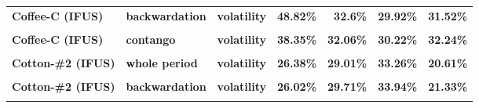 \documentclass[
  authoryear,
  preprint,
  3p]{elsarticle}
\begin{document}
\begin{longtable}[t]{>{}l>{}l>{}l>{}r>{}r>{}r>{}r}
\textbf{Coffee-C (IFUS)} & \textbf{backwardation} & \textbf{volatility} & \textcolor[HTML]{4285f4}{\textbf{48.82\%}} & \textcolor[HTML]{4285f4}{\textbf{32.6\%}} & \textcolor[HTML]{4285f4}{\textbf{29.92\%}} & \textcolor[HTML]{4285f4}{\textbf{31.52\%}}\\
\textbf{\cellcolor{gray!10}{Coffee-C (IFUS)}} & \textbf{\cellcolor{gray!10}{contango}} & \textbf{\cellcolor{gray!10}{mean}} & \textcolor[HTML]{4285f4}{\textbf{\cellcolor{gray!10}{-16.87\%}}} & \textcolor[HTML]{4285f4}{\textbf{\cellcolor{gray!10}{14.38\%}}} & \textcolor[HTML]{4285f4}{\textbf{\cellcolor{gray!10}{3.4\%}}} & \textcolor[HTML]{4285f4}{\textbf{\cellcolor{gray!10}{-10.24\%}}}\\
\addlinespace
\textbf{Coffee-C (IFUS)} & \textbf{contango} & \textbf{volatility} & \textcolor[HTML]{4285f4}{\textbf{38.35\%}} & \textcolor[HTML]{4285f4}{\textbf{32.06\%}} & \textcolor[HTML]{4285f4}{\textbf{30.22\%}} & \textcolor[HTML]{4285f4}{\textbf{32.24\%}}\\
\textbf{\cellcolor{gray!10}{Cotton-\#2 (IFUS)}} & \textbf{\cellcolor{gray!10}{whole period}} & \textbf{\cellcolor{gray!10}{mean}} & \textcolor[HTML]{4285f4}{\textbf{\cellcolor{gray!10}{3.24\%}}} & \textcolor[HTML]{4285f4}{\textbf{\cellcolor{gray!10}{0.95\%}}} & \textcolor[HTML]{4285f4}{\textbf{\cellcolor{gray!10}{12.53\%}}} & \textcolor[HTML]{4285f4}{\textbf{\cellcolor{gray!10}{0.5\%}}}\\
\textbf{Cotton-\#2 (IFUS)} & \textbf{whole period} & \textbf{volatility} & \textcolor[HTML]{4285f4}{\textbf{26.38\%}} & \textcolor[HTML]{4285f4}{\textbf{29.01\%}} & \textcolor[HTML]{4285f4}{\textbf{33.26\%}} & \textcolor[HTML]{4285f4}{\textbf{20.61\%}}\\
\textbf{\cellcolor{gray!10}{Cotton-\#2 (IFUS)}} & \textbf{\cellcolor{gray!10}{backwardation}} & \textbf{\cellcolor{gray!10}{mean}} & \textcolor[HTML]{4285f4}{\textbf{\cellcolor{gray!10}{22.64\%}}} & \textcolor[HTML]{4285f4}{\textbf{\cellcolor{gray!10}{7.85\%}}} & \textcolor[HTML]{4285f4}{\textbf{\cellcolor{gray!10}{35.53\%}}} & \textcolor[HTML]{4285f4}{\textbf{\cellcolor{gray!10}{10.84\%}}}\\
\textbf{Cotton-\#2 (IFUS)} & \textbf{backwardation} & \textbf{volatility} & \textcolor[HTML]{4285f4}{\textbf{26.02\%}} & \textcolor[HTML]{4285f4}{\textbf{29.71\%}} & \textcolor[HTML]{4285f4}{\textbf{33.94\%}} & \textcolor[HTML]{4285f4}{\textbf{21.33\%}}\\
\addlinespace
\textbf{\cellcolor{gray!10}{Cotton-\#2 (IFUS)}} & \textbf{\cellcolor{gray!10}{contango}} & \textbf{\cellcolor{gray!10}{mean}} & \textcolor[HTML]{4285f4}{\textbf{\cellcolor{gray!10}{-16.46\%}}} & \textcolor[HTML]{4285f4}{\textbf{\cellcolor{gray!10}{-5.92\%}}} & \textcolor[HTML]{4285f4}{\textbf{\cellcolor{gray!10}{-9.36\%}}} & \textcolor[HTML]{4285f4}{\textbf{\cellcolor{gray!10}{-8.91\%}}}\\

\end{longtable}
\end{document}
